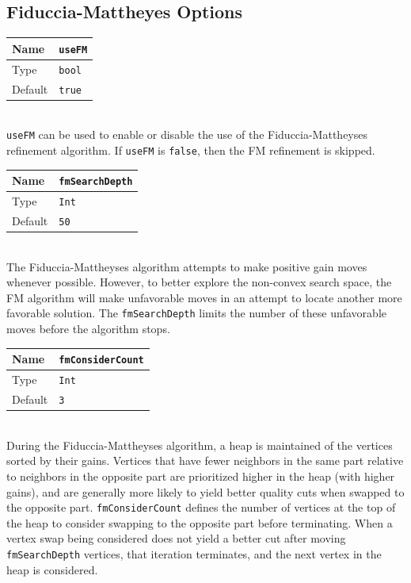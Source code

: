 \documentclass[letter]{article}
\begin{document}
\subsection{Fiduccia-Mattheyes Options}

\begin{tabular}{|l|l|} \hline
Name & \texttt{useFM} \\ \hline
Type & \texttt{bool} \\ \hline
Default & \texttt{true} \\ \hline
\end{tabular}\\

\texttt{useFM} can be used to enable or disable the use of the Fiduccia-Mattheyses refinement algorithm. If \texttt{useFM} is \texttt{false}, then the FM refinement is skipped.\\

\begin{tabular}{|l|l|} \hline
Name & \texttt{fmSearchDepth} \\ \hline
Type & \texttt{Int} \\ \hline
Default & \texttt{50} \\ \hline
\end{tabular}\\

The Fiduccia-Mattheyses algorithm attempts to make positive gain moves whenever possible. However, to better explore the non-convex search space, the FM algorithm will make unfavorable moves in an attempt to locate another more favorable solution. The \texttt{fmSearchDepth} limits the number of these unfavorable moves before the algorithm stops.

\baselineskip
\begin{tabular}{|l|l|} \hline
Name & \texttt{fmConsiderCount} \\ \hline
Type & \texttt{Int} \\ \hline
Default & \texttt{3} \\ \hline
\end{tabular}\\

During the Fiduccia-Mattheyses algorithm, a heap is maintained of the vertices sorted by their gains. Vertices that have fewer neighbors in the same part relative to neighbors in the opposite part are prioritized higher in the heap (with higher gains), and are generally more likely to yield better quality cuts when swapped to the opposite part. \texttt{fmConsiderCount} defines the number of vertices at the top of the heap to consider swapping to the opposite part before terminating. When a vertex swap being considered does not yield a better cut after moving \texttt{fmSearchDepth} vertices, that iteration terminates, and the next vertex in the heap is considered.
\end{document}
